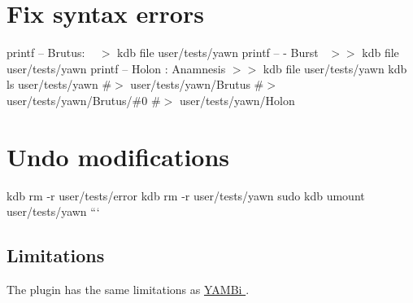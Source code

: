 \section*{Fix syntax errors}

printf -- \textquotesingle{}Brutus\+: ~\newline
\textquotesingle{} $>$ {\ttfamily kdb file user/tests/yawn} printf -- \textquotesingle{} -\/ Burst~\newline
\textquotesingle{} $>$$>$ {\ttfamily kdb file user/tests/yawn} printf -- \textquotesingle{}Holon \+: Anamnesis\textquotesingle{} $>$$>$ {\ttfamily kdb file user/tests/yawn} kdb ls user/tests/yawn \#$>$ user/tests/yawn/\+Brutus \#$>$ user/tests/yawn/\+Brutus/\#0 \#$>$ user/tests/yawn/\+Holon

\section*{Undo modifications}

kdb rm -\/r user/tests/error kdb rm -\/r user/tests/yawn sudo kdb umount user/tests/yawn ```

\subsection*{Limitations}

The plugin has the same limitations as \hyperlink{md_src_plugins_yambi_README_src_plugins_yambi_README_md}{Y\+A\+M\+Bi }. 